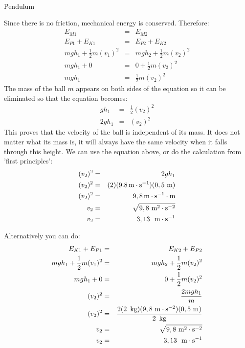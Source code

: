 \begin{wex}{Pendulum}
{
Since there is no friction, mechanical energy is conserved. Therefore: 
\begin{eqnarray*}
E_{M1} &=& E_{M2}\\
E_{P1} + E_{K1} &=& E_{P2} + E_{K2}\\
mgh_1 + \frac{1}{2}m(v_1)^2 &=& mgh_2 + \frac{1}{2}m(v_2)^2\\
mgh_1 + 0 &=& 0 + \frac{1}{2}m(v_2)^2\\
mgh_1 &=& \frac{1}{2}m(v_2)^2
\end{eqnarray*}
The mass of the ball $m$ appears on both sides of the equation so it can be eliminated so that the equation becomes:
\begin{eqnarray*}
gh_1 &=& \frac{1}{2}(v_2)^2 \\
2gh_1 &=& (v_2)^2
\end{eqnarray*}
This proves that the velocity of the ball is independent of its mass. It does not matter what its mass is, it will always have the same velocity when it falls through this height.
We can use the equation above, or do the calculation from 'first principles':
\begin{eqnarray*}
(v_2)^2 &=& 2gh_1\\
(v_2)^2 &=& (2)(9.8\,\text{m} \cdot \text{s}^{-1})(0,5~\text{m})\\
(v_2)^2 &=& 9,8\,\text{m} \cdot \text{s}^{-1}\cdot\text{m}\\
v_2 &=& \sqrt{9,8~\text{m}^2\cdot\text{s}^{-2}} \\
v_2 &=& 3,13~ \ \text{m} \cdot \text{s}^{-1}
\end{eqnarray*}

Alternatively you can do: 
\begin{eqnarray*}
E_{K1} + E_{P1} &=& E_{K2} + E_{P2} \\
mgh_1 + \frac{1}{2}m(v_1)^2 &=& mgh_2 + \frac{1}{2}m(v_2)^2\\
mgh_1 + 0 &=& 0 + \frac{1}{2}m(v_2)^2\\
(v_{2})^2 &=& \frac{2mgh_1}{m} \\
(v_{2})^2 &=& \frac{2(2~\,\text{kg})(9,8~\text{m}\cdot \text{s}^{-2})(0,5~\text{m})}{2~\,\text{kg}} \\
v_2 &=& \sqrt{9,8~\text{m}^2 \cdot \text{s}^{-2}} \\
v_2 &=& 3,13~ \ \text{m} \cdot \text{s}^{-1}
\end{eqnarray*}
}
\end{wex}


